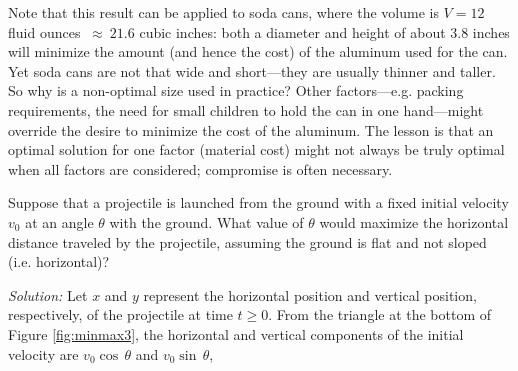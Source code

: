 \begin{exmp}
\par\noindent Note that this result can be applied to soda cans, where the
volume is $V = 12$ fluid ounces $~\approx~ 21.6$ cubic inches: both a diameter
and height of about $3.8$ inches will minimize the amount (and hence the cost)
of the aluminum used for the can. Yet soda cans are not that wide and
short---they are usually thinner and taller. So why is a non-optimal size used
in practice? Other factors---e.g. packing requirements, the need for small
children to hold the can in one hand---might override the desire to minimize the
cost of the aluminum. The lesson is that an optimal solution for one factor
(material cost) might not always be truly optimal when all factors are
considered; compromise is often necessary.
\end{exmp}
\begin{exmp}\label{exmp:minmax3}
 \piccaption[]{\label{fig:minmax3}}
\noindent Suppose that a projectile is launched from the ground with a fixed initial
velocity $v_0$ at an angle $\theta$ with the ground. What value of $\theta$ would
maximize the horizontal distance traveled by the projectile, assuming the ground is
flat and not sloped (i.e. horizontal)?\vspace{1mm}
\par\noindent\emph{Solution:} Let $x$ and $y$ represent the horizontal position
and vertical position, respectively, of the projectile at time $t \ge 0$. From the
triangle at the bottom of Figure \ref{fig:minmax3}, the horizontal and vertical
components of the initial velocity are $v_0 \cos\,\theta$ and $v_0 \sin\,\theta$,

\end{exmp}
